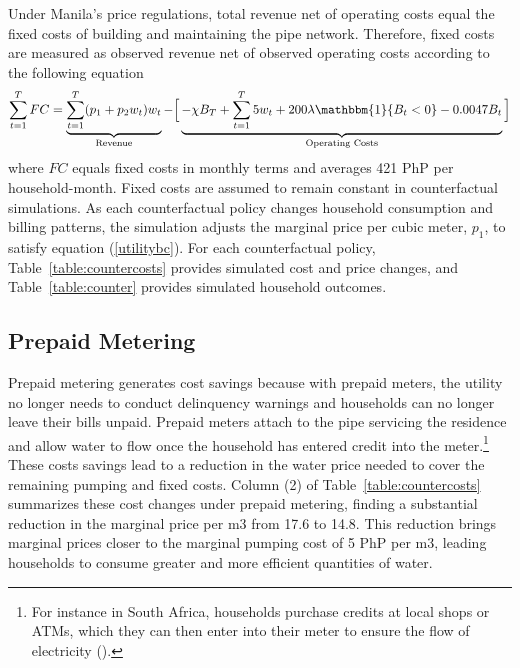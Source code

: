 \documentclass[12pt]{article}
\begin{document}
Under Manila's price regulations, total revenue net of operating costs equal the fixed costs of building and maintaining the pipe network.  Therefore, fixed costs are measured as observed revenue net of observed operating costs according to the following equation
\begin{align}
\label{utilitybc}
\sum_{t=1}^{T} FC = \underbrace{\sum_{t=1}^{T} (p_1+p_2 w_t)w_t}_{\text{Revenue}}  - \Big[ \underbrace{-\chi B_T +  \sum_{t=1}^{T} 5 w_t + 200 \lambda \mathbbm{1}\{B_t < 0 \} - 0.0047 B_t}_{\text{Operating Costs}} \Big]
\end{align}
where $FC$ equals fixed costs in monthly terms and averages 421 PhP per household-month.  Fixed costs are assumed to remain constant in counterfactual simulations.  As each counterfactual policy changes household consumption and billing patterns, the simulation adjusts the marginal price per cubic meter, $p_1$, to satisfy equation (\ref{utilitybc}).  For each counterfactual policy, Table~\ref{table:countercosts} provides simulated cost and price changes, and Table~\ref{table:counter} provides simulated household outcomes.  

\subsection{Prepaid Metering}\label{section:prepaidmeters}

Prepaid metering generates cost savings because with prepaid meters, the utility no longer needs to conduct delinquency warnings and households can no longer leave their bills unpaid.  Prepaid meters attach to the pipe servicing the residence and allow water to flow once the household has entered credit into the meter.\footnote{For instance in South Africa, households purchase credits at local shops or ATMs, which they can then enter into their meter to ensure the flow of electricity (\cite{jack2020charging}).}  These costs savings lead to a reduction in the water price needed to cover the remaining pumping and fixed costs.  Column (2) of Table~\ref{table:countercosts} summarizes these cost changes under prepaid metering, finding a substantial reduction in the marginal price per m3 from 17.6 to 14.8\unskip.  This reduction brings marginal prices closer to the marginal pumping cost of 5 PhP per m3, leading households to consume greater and more efficient quantities of water.
\end{document}
